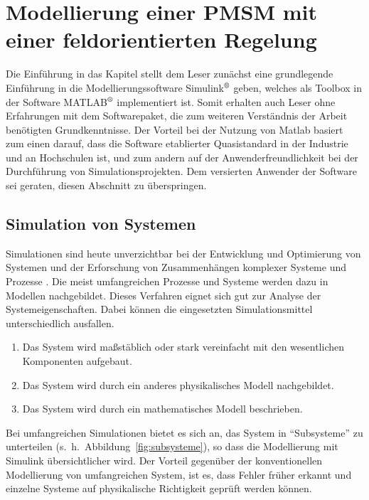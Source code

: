 
\chapter{Modellierung einer PMSM mit einer feldorientierten Regelung}
\label{cha:regelungpmsm}

Die Einführung in das Kapitel stellt dem Leser zunächst eine grundlegende Einführung in die Modellierungssoftware  Simulink$^\text{\textregistered}$ geben, welches als Toolbox in der Software MATLAB$^\text{\textregistered}$ implementiert ist.
Somit erhalten auch Leser ohne Erfahrungen mit dem Softwarepaket, die zum weiteren Verständnis der Arbeit benötigten Grundkenntnisse.
Der Vorteil bei der Nutzung von Matlab basiert zum einen darauf, dass die Software etablierter Quasistandard in der Industrie und an Hochschulen ist, und zum andern auf der Anwenderfreundlichkeit bei der Durchführung von Simulationsprojekten. \autocite[Vorwort]{scherf2010}
Dem versierten Anwender der Software sei geraten, diesen Abschnitt zu überspringen.

\section{Simulation von Systemen}\label{sec:simulation}

Simulationen sind heute unverzichtbar bei der Entwicklung und Optimierung von Systemen und der Erforschung von Zusammenhängen komplexer Systeme und Prozesse \autocite{brychta}.
Die meist umfangreichen Prozesse und Systeme werden dazu in Modellen nachgebildet.
Dieses Verfahren eignet sich gut zur Analyse der Systemeigenschaften.
Dabei können die eingesetzten Simulationsmittel unterschiedlich ausfallen.

\begin{enumerate}
	\item Das System wird maßstäblich oder stark vereinfacht mit den wesentlichen Komponenten aufgebaut.
	\item Das System wird durch ein anderes physikalisches Modell nachgebildet.
	\item Das System wird durch ein mathematisches Modell beschrieben.
\end{enumerate}

Bei umfangreichen Simulationen bietet es sich an, das System in \enquote{Subsysteme} zu unterteilen (s.~h.~Abbildung~\ref{fig:subsysteme}), so dass die Modellierung mit Simulink übersichtlicher wird.
Der Vorteil gegenüber der konventionellen Modellierung von umfangreichen System, ist es, dass Fehler früher erkannt und einzelne Systeme auf physikalische Richtigkeit geprüft werden können.

